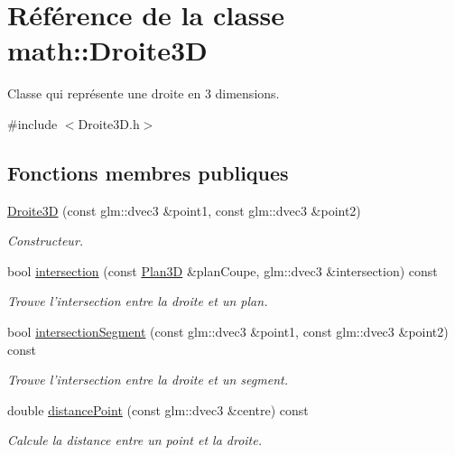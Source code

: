 \hypertarget{classmath_1_1_droite3_d}{\section{Référence de la classe math\-:\-:Droite3\-D}
\label{classmath_1_1_droite3_d}
}


Classe qui représente une droite en 3 dimensions.  




{\ttfamily \#include $<$Droite3\-D.\-h$>$}

\subsection*{Fonctions membres publiques}
\begin{DoxyCompactItemize}
\item 
\hyperlink{classmath_1_1_droite3_d_a9248463117b4567a6e68a88f5760f07a}{Droite3\-D} (const glm\-::dvec3 \&point1, const glm\-::dvec3 \&point2)
\begin{DoxyCompactList}\small\item\em Constructeur. \end{DoxyCompactList}\item 
bool \hyperlink{classmath_1_1_droite3_d_aeb85e1075b0c2b8780fbf080c95c5152}{intersection} (const \hyperlink{classmath_1_1_plan3_d}{Plan3\-D} \&plan\-Coupe, glm\-::dvec3 \&intersection) const 
\begin{DoxyCompactList}\small\item\em Trouve l'intersection entre la droite et un plan. \end{DoxyCompactList}\item 
bool \hyperlink{classmath_1_1_droite3_d_ae74763c2b784d2cf40c166067c5398ca}{intersection\-Segment} (const glm\-::dvec3 \&point1, const glm\-::dvec3 \&point2) const 
\begin{DoxyCompactList}\small\item\em Trouve l'intersection entre la droite et un segment. \end{DoxyCompactList}\item 
double \hyperlink{classmath_1_1_droite3_d_a30e1d51b339d65cd25a985352aed1526}{distance\-Point} (const glm\-::dvec3 \&centre) const 
\begin{DoxyCompactList}\small\item\em Calcule la distance entre un point et la droite. \end{DoxyCompactList}\item 

\end{DoxyCompactItemize}
